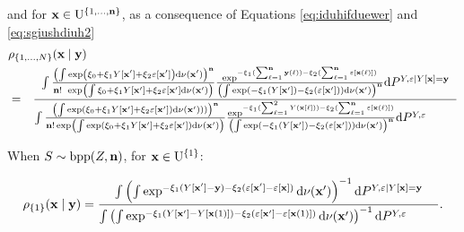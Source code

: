 and for  $\mathbf{x}\in\mathrm{U}^{\{1,\ldots,\mathbf{n}\}}$, as a consequence of Equations \eqref{eq:iduhifduewer} and \eqref{eq:sgiushdiuh2}
\begin{eqnarray*}
\lefteqn{\densityratio_{\{1,\ldots,\Samplesize\}}(\position\mid\signal)}\\&=&\frac{
\int 
\frac{\left(\int \exp\left(\paramnuisance_0+\paramnuisance_1\Signal[\position']+\paramnuisance_2\varepsilon[\position']\right)\derive\dominantU(\position')\right)^\samplesize}{\samplesize!~\exp\left(\int \paramnuisance_0+\paramnuisance_1\Signal[\position']+\paramnuisance_2\varepsilon[\position']\derive\dominantU(\position')\right)}\frac{
\exp^{-\paramnuisance_1(\sum_{\ell=1}^\samplesize\signal(\ell))-\paramnuisance_2(\sum_{\ell=1}^\samplesize\varepsilon[\position(\ell)])}}{
\left(\int \exp\left(-\paramnuisance_1(\Signal[\position'])-\paramnuisance_2(\varepsilon[\position'])\right)\derive\nu(\position')\right)^\samplesize
}\derive P^{\Signal,\varepsilon\mid \Signal[\position]=\signal} 
}{
\int 
\frac{\left(\int\exp\left( \paramnuisance_0+\paramnuisance_1\Signal[\position']+\paramnuisance_2\varepsilon[\position']\right)\derive\dominantU(\position')))\right)^\samplesize}{\samplesize!\exp\left(\int \exp\left(\paramnuisance_0+\paramnuisance_1\Signal[\position']+\paramnuisance_2\varepsilon[\position']\right)\derive\dominantU(\position')\right)}\frac{
\exp^{-\paramnuisance_1(\sum_{\ell=1}^2\Signal(\position[\ell]))-\paramnuisance_2(\sum_{\ell=1}^\samplesize\varepsilon[\position(\ell)])}}{
\left(\int \exp\left(-\paramnuisance_1(\Signal[\position'])-\paramnuisance_2(\varepsilon[\position'])\right)\derive\nu(\position')\right)^\samplesize
}\derive P^{\Signal,\varepsilon}\phantom{11111} 
}
\end{eqnarray*}



When $S\sim \mathrm{bpp}(Z,\mathbf{n})$, for $\mathbf{x} \in \mathrm{U}^{\{1\}}$:

\begin{equation*}
\rho_{\{1\}}(\mathbf{x}\mid\mathbf{y})=
\frac{
\int 
\left(\int \exp^{-\xi_1(Y[\mathbf{x}']-\mathbf{y})-\xi_2(\varepsilon[\mathbf{x}']-\varepsilon[\mathbf{x}])}\mathrm{d}\nu(\mathbf{x}')\right)^{-1}\mathrm{d} P^{Y,\varepsilon\mid Y[\mathbf{x}]=\mathbf{y}} 
}{
\int
\left(\int \exp^{-\xi_1(Y[\mathbf{x}']-Y[\mathbf{x}(1)])-\xi_2(\varepsilon[\mathbf{x}']-\varepsilon[\mathbf{x}(1)])}\mathrm{d}\nu(\mathbf{x}')\right)^{-1}\mathrm{d} P^{Y,\varepsilon}\phantom{11111} 
}.
\end{equation*}

